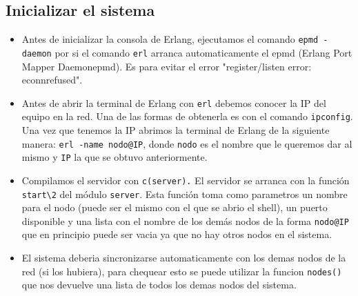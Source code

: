 \documentclass[a4paper]{article}
\newcommand{\blacktr}[0]{\item[$\blacktriangleright$]}
\begin{document}
\subsection*{Inicializar el sistema}
\begin{itemize}
    \blacktr Antes de inicializar la consola de Erlang, ejecutamos el comando \texttt{\textdollar epmd -daemon} por si el comando \texttt{\textdollar erl} arranca automaticamente el epmd (Erlang  Port  Mapper  Daemonepmd). Es para evitar el error "register/listen error: econnrefused".
    
    \blacktr Antes de abrir la terminal de Erlang con \texttt{\textdollar erl} debemos conocer la IP del equipo en la red. Una de las formas de obtenerla es con el comando \texttt{\textdollar ipconfig}. Una vez que tenemos la IP abrimos la terminal de Erlang de la siguiente manera: \texttt{erl -name nodo@IP}, donde \texttt{nodo} es el nombre que le queremos dar al mismo y \texttt{IP} la que se obtuvo anteriormente.
    
    \blacktr Compilamos el servidor con \texttt{c(server).} El servidor se arranca con la función \texttt{start\textbackslash2} del módulo \texttt{server}. Esta función toma como parametros un nombre para el nodo (puede ser el mismo con el que se abrio el shell), un puerto disponible y una lista con el nombre de los demás nodos de la forma \texttt{nodo@IP} que en principio puede ser vacia ya que no hay otros nodos en el sistema. 

    \blacktr El sistema deberia sincronizarse automaticamente con los demas nodos de la red (si los hubiera), para chequear esto se puede utilizar la funcion \texttt{nodes()} que nos devuelve una lista de todos los demas nodos del sistema.

\end{itemize}
\end{document}
